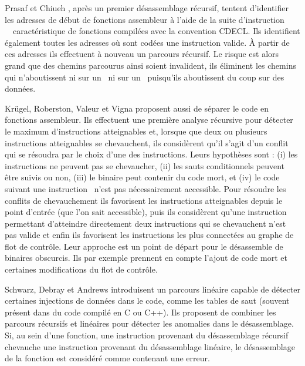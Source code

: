 Prasaf et Chiueh \cite{PC03}, après un premier désassemblage récursif, tentent d'identifier les adresses de début de fonctions assembleur à l'aide de la suite d'instruction \push\ \mov\ caractéristique de fonctions compilées avec la convention CDECL. Ils identifient également toutes les adresses où sont codées une instruction valide. À partir de ces adresses ils effectuent à nouveau un parcours récursif. Le risque est alors grand que des chemins parcourus ainsi soient invalident, ils éliminent les chemins qui n'aboutissent ni sur un \ret\ ni sur un \jmp\ puisqu'ils aboutissent du coup sur des données.





Krügel, Roberston, Valeur et Vigna \cite{KruegelRVV04} proposent aussi de séparer le code en fonctions assembleur. Ils effectuent une première analyse récursive pour détecter le maximum d'instructions atteignables et, lorsque que deux ou plusieurs instructions atteignables se chevauchent, ils considèrent qu'il s'agit d'un conflit qui se résoudra par le choix d'une des instructions.
Leurs hypothèses sont : (i) les instructions ne peuvent pas se chevaucher, (ii) les sauts conditionnels peuvent être suivis ou non, (iii) le binaire peut contenir du code mort, et (iv) le code suivant une instruction \call\ n'est pas nécessairement accessible. Pour résoudre les conflits de chevauchement ils favorisent les instructions atteignables depuis le point d'entrée (que l'on sait accessible), puis ils considèrent qu'une instruction permettant d'atteindre directement deux instructions qui se chevauchent n'est pas valide et enfin ils favorisent les instructions les plus connectées au graphe de flot de contrôle.
Leur approche est un point de départ pour le désassemble de binaires obscurcis. Ils par exemple prennent en compte l'ajout de code mort et certaines modifications du flot de contrôle.

Schwarz, Debray et Andrews \cite{SDA02} introduisent un parcours linéaire capable de détecter certaines injections de données dans le code, comme les tables de saut (souvent présent dans du code compilé en C ou C++). Ils proposent de combiner les parcours récursifs et linéaires pour détecter les anomalies dans le désassemblage. Si, au sein d'une fonction, une instruction provenant du désassemblage récursif chevauche une instruction provenant du désassemblage linéaire, le désassemblage de la fonction est considéré comme contenant une erreur.
\\

